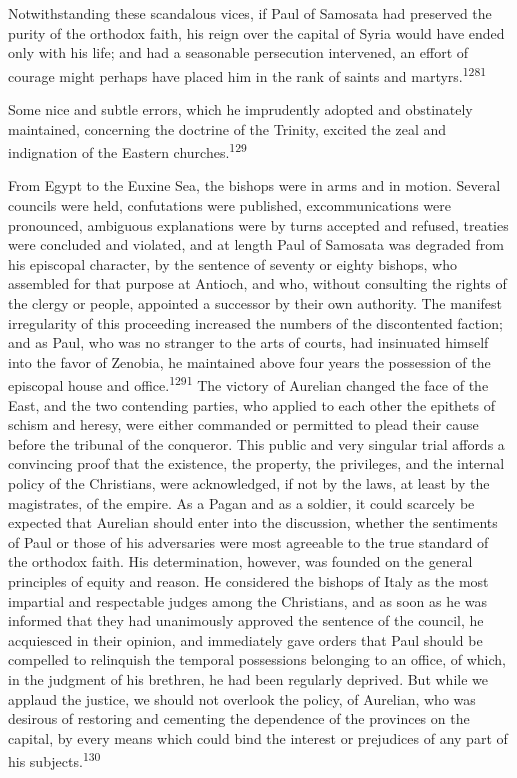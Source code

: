 
Notwithstanding these scandalous vices, if Paul of Samosata had
preserved the purity of the orthodox faith, his reign over the
capital of Syria would have ended only with his life; and had a
seasonable persecution intervened, an effort of courage might
perhaps have placed him in the rank of saints and martyrs.\textsuperscript{1281}

Some nice and subtle errors, which he imprudently adopted and
obstinately maintained, concerning the doctrine of the Trinity,
excited the zeal and indignation of the Eastern churches.\textsuperscript{129}

From Egypt to the Euxine Sea, the bishops were in arms and in
motion. Several councils were held, confutations were published,
excommunications were pronounced, ambiguous explanations were by
turns accepted and refused, treaties were concluded and violated,
and at length Paul of Samosata was degraded from his episcopal
character, by the sentence of seventy or eighty bishops, who
assembled for that purpose at Antioch, and who, without
consulting the rights of the clergy or people, appointed a
successor by their own authority. The manifest irregularity of
this proceeding increased the numbers of the discontented
faction; and as Paul, who was no stranger to the arts of courts,
had insinuated himself into the favor of Zenobia, he maintained
above four years the possession of the episcopal house and
office.\textsuperscript{1291} The victory of Aurelian changed the face of the
East, and the two contending parties, who applied to each other
the epithets of schism and heresy, were either commanded or
permitted to plead their cause before the tribunal of the
conqueror. This public and very singular trial affords a
convincing proof that the existence, the property, the
privileges, and the internal policy of the Christians, were
acknowledged, if not by the laws, at least by the magistrates, of
the empire. As a Pagan and as a soldier, it could scarcely be
expected that Aurelian should enter into the discussion, whether
the sentiments of Paul or those of his adversaries were most
agreeable to the true standard of the orthodox faith. His
determination, however, was founded on the general principles of
equity and reason. He considered the bishops of Italy as the most
impartial and respectable judges among the Christians, and as
soon as he was informed that they had unanimously approved the
sentence of the council, he acquiesced in their opinion, and
immediately gave orders that Paul should be compelled to
relinquish the temporal possessions belonging to an office, of
which, in the judgment of his brethren, he had been regularly
deprived. But while we applaud the justice, we should not
overlook the policy, of Aurelian, who was desirous of restoring
and cementing the dependence of the provinces on the capital, by
every means which could bind the interest or prejudices of any
part of his subjects.\textsuperscript{130}

